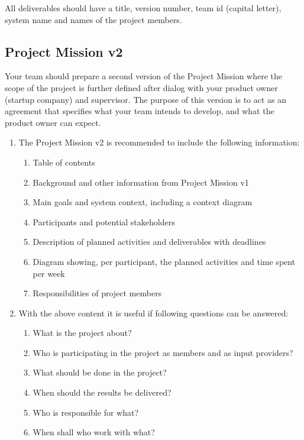 \noindent All deliverables should have a title, version number, team id (capital letter), system name and names of the project members.

\subsection{Project Mission v2}
Your team should prepare a second version of the Project Mission where the scope of the project is further defined after dialog with your product owner (startup company) and supervisor. The purpose of this version is to act as an agreement that specifies what your team intends to develop, and what the product owner can expect.

 \begin{enumerate}
  \item The Project Mission v2 is recommended to include the following information:
  \begin{enumerate}
    \item Table of contents
    \item Background and other information from Project Mission v1
    \item Main goals and system context, including a context diagram
    \item Participants and potential stakeholders
    \item Description of planned activities and deliverables with deadlines
    \item Diagram showing, per participant, the planned activities and time spent per week
    \item Responsibilities of project members
  \end{enumerate}
  \item With the above content it is useful if following questions can be answered:
  \begin{enumerate}
   \item What is the project about?
   \item Who is participating in the project as members and as input providers?
   \item What should be done in the project?
   \item When should the results be delivered?
   \item Who is responsible for what?
   \item When shall who work with what?
 \end{enumerate}
\end{enumerate}

